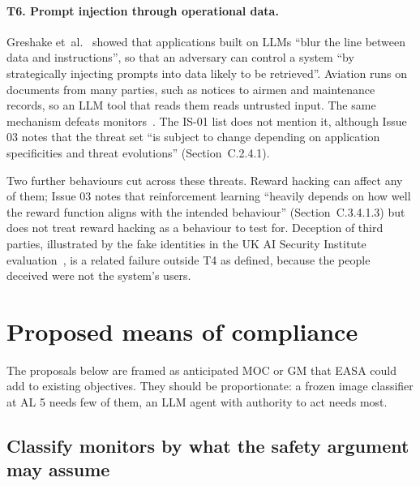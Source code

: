 \documentclass[11pt]{article}
\begin{document}
\paragraph{T6. Prompt injection through operational data.} Greshake et~al.~\cite{greshake2023injection} showed that applications built on LLMs ``blur the line between data and instructions'', so that an adversary can control a system ``by strategically injecting prompts into data likely to be retrieved''. Aviation runs on documents from many parties, such as notices to airmen and maintenance records, so an LLM tool that reads them reads untrusted input. The same mechanism defeats monitors~\cite{terekhov2025adaptive,remedios2026redteaming}. The IS-01 list does not mention it, although Issue 03 notes that the threat set ``is subject to change depending on application specificities and threat evolutions'' (Section~C.2.4.1).

Two further behaviours cut across these threats. Reward hacking can affect any of them; Issue 03 notes that reinforcement learning ``heavily depends on how well the reward function aligns with the intended behaviour'' (Section~C.3.4.1.3) but does not treat reward hacking as a behaviour to test for. Deception of third parties, illustrated by the fake identities in the UK AI Security Institute evaluation~\cite{anthropic2026aisi,aisi2026incident}, is a related failure outside T4 as defined, because the people deceived were not the system's users.

\section{Proposed means of compliance}\label{sec:moc}

The proposals below are framed as anticipated MOC or GM that EASA could add to existing objectives. They should be proportionate: a frozen image classifier at AL 5 needs few of them, an LLM agent with authority to act needs most.

\subsection{Classify monitors by what the safety argument may assume}\label{sec:classify}
\end{document}
